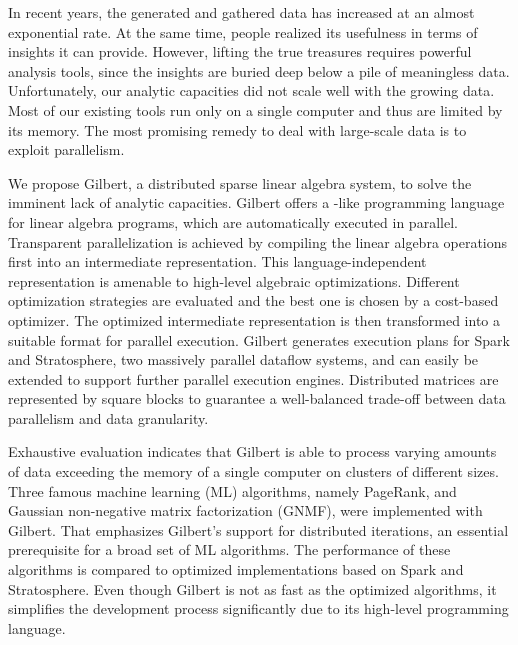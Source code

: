\clearemptydoublepage
{}
{}

\vspace*{2cm}
\begin{center}
\end{center}
\vspace{1cm}

In recent years, the generated and gathered data has increased at an almost exponential rate.
At the same time, people realized its usefulness in terms of insights it can provide.
However, lifting the true treasures requires powerful analysis tools, since the insights are buried deep below a pile of meaningless data.
Unfortunately, our analytic capacities did not scale well with the growing data.
Most of our existing tools run only on a single computer and thus are limited by its memory.
The most promising remedy to deal with large-scale data is to exploit parallelism.

We propose Gilbert, a distributed sparse linear algebra system, to solve the imminent lack of analytic capacities.
Gilbert offers a \matlab-like programming language for linear algebra programs, which are automatically executed in parallel.
Transparent parallelization is achieved by compiling the linear algebra operations first into an intermediate representation.
This language-independent representation is amenable to high-level algebraic optimizations.
Different optimization strategies are evaluated and the best one is chosen by a cost-based optimizer.
The optimized intermediate representation is then transformed into a suitable format for parallel execution.
Gilbert generates execution plans for Spark and Stratosphere, two massively parallel dataflow systems, and can easily be extended to support further parallel execution engines.
Distributed matrices are represented by square blocks to guarantee a well-balanced trade-off between data parallelism and data granularity.

Exhaustive evaluation indicates that Gilbert is able to process varying amounts of data exceeding the memory of a single computer on clusters of different sizes.
Three famous machine learning (ML) algorithms, namely PageRank, \kmeans and Gaussian non-negative matrix factorization (GNMF), were implemented with Gilbert.
That emphasizes Gilbert's support for distributed iterations, an essential prerequisite for a broad set of ML algorithms.
The performance of these algorithms is compared to optimized implementations based on Spark and Stratosphere.
Even though Gilbert is not as fast as the optimized algorithms, it simplifies the development process significantly due to its high-level programming language.